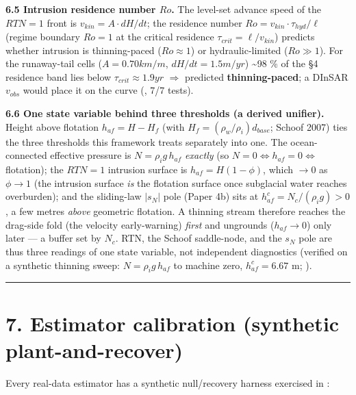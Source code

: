 \documentclass[11pt]{article}
\begin{document}
\textbf{6.5 Intrusion residence number $Ro$.} The level-set advance speed of the $RTN=1$ front is $v_{kin}=A\cdot dH/dt$; the residence number $Ro=v_{kin}\cdot \tau _{hyd}/\ell $ (regime boundary $Ro=1$ at the critical residence $\tau _{crit}=\ell /v_{kin}$) predicts whether intrusion is thinning-paced ($Ro\approx 1$) or hydraulic-limited ($Ro\gg 1$). For the runaway-tail cells ($A=0.70 km/m$, $dH/dt=1.5 m/yr$) \textasciitilde{}98 \% of the §4 residence band lies below $\tau _{crit}\approx 1.9 yr$ \ensuremath{\Rightarrow} predicted \textbf{thinning-paced}; a DInSAR $v_{obs}$ would place it on the curve (, 7/7 tests).


\textbf{6.6 One state variable behind three thresholds (a derived unifier).} Height above flotation $h_{af}=H-H_{f}$ (with $H_{f}=(\rho _{w}/\rho _{i})d_{base}$; Schoof 2007) ties the three thresholds this framework treats separately into one. The ocean-connected effective pressure is $N=\rho _{i}g\,h_{af}$ \emph{exactly} (so $N=0\iff h_{af}=0\iff $ flotation); the $RTN=1$ intrusion surface is $h_{af}=H(1-\phi )$, which $\to 0$ as $\phi \to 1$ (the intrusion surface \emph{is} the flotation surface once subglacial water reaches overburden); and the sliding-law $|s_{N}|$ pole (Paper 4b) sits at $h_{af}^{c}=N_{c}/(\rho _{i}g)>0$, a few metres \emph{above} geometric flotation. A thinning stream therefore reaches the drag-side fold (the velocity early-warning) \emph{first} and ungrounds ($h_{af}\to 0$) only later --- a buffer set by $N_{c}$. RTN, the Schoof saddle-node, and the $s_{N}$ pole are thus three readings of one state variable, not independent diagnostics (verified on a synthetic thinning sweep: $N=\rho _{i}g\,h_{af}$ to machine zero, $h_{af}^{c}=6.67$ m; ).


\medskip\hrule\medskip


\section*{7. Estimator calibration (synthetic plant-and-recover)}


Every real-data estimator has a synthetic null/recovery harness exercised in :
\end{document}
